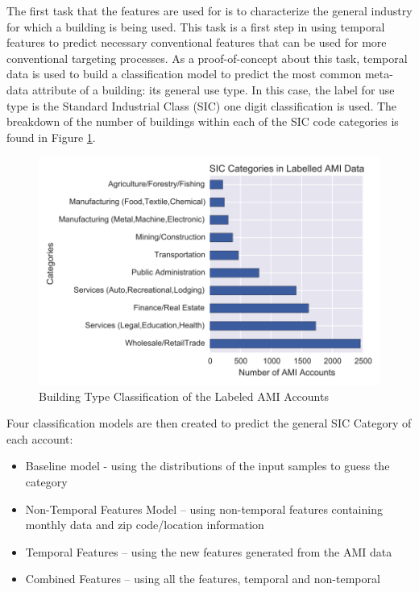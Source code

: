 The first task that the features are used for is to characterize the general industry for which a building is being used. This task is a first step in using temporal features to predict necessary conventional features that can be used for more conventional targeting processes. As a proof-of-concept about this task, temporal data is used to build a classification model to predict the most common meta-data attribute of a building: its general use type. In this case, the label for use type is the Standard Industrial Class (SIC) one digit classification is used. The breakdown of the number of buildings within each of the SIC code categories is found in Figure \ref{fig:buildingtypeclass}.





\begin{figure}[ht!]
\begin{center}
\includegraphics[width=0.84\columnwidth]{figures/measures/measures}
\caption{{Building Type Classification of the Labeled AMI Accounts
\label{fig:buildingtypeclass}%
}}
\end{center}
\end{figure}

Four classification models are then created to predict the general SIC Category of each account:
\begin{itemize}
\item Baseline model - using the distributions of the input samples to guess the category
\item Non-Temporal Features Model -- using non-temporal features containing monthly data and zip code/location information
\item Temporal Features -- using the new features generated from the AMI data
\item Combined Features -- using all the features, temporal and non-temporal
\end{itemize}

